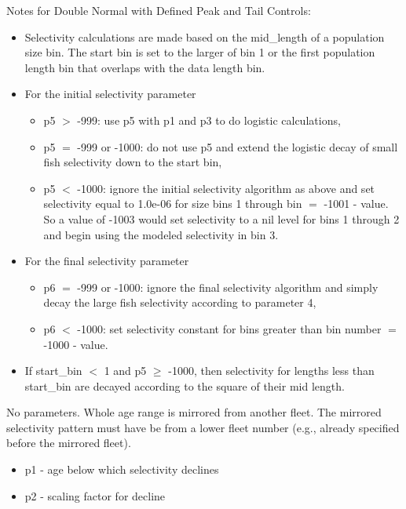 Notes for Double Normal with Defined Peak and Tail Controls:
	\begin{itemize}
		\item Selectivity calculations are made based on the mid\_length of a population size bin. The start bin is set to the larger of bin 1 or the first population length bin that overlaps with the data length bin.
		\item For the initial selectivity parameter
		\begin{itemize}
			\item p5 $>$ -999: use p5 with p1 and p3 to do logistic calculations,
			\item p5 $=$ -999 or -1000: do not use p5 and extend the logistic decay of small fish selectivity down to the start bin,
			\item p5 $<$ -1000: ignore the initial selectivity algorithm as above and set selectivity equal to 1.0e-06 for size bins 1 through bin $=$ -1001 - value. So a value of -1003 would set selectivity to a nil level for bins 1 through 2 and begin using the modeled selectivity in bin 3.
		\end{itemize}
		\item For the final selectivity parameter
		\begin{itemize}
			\item p6 $=$ -999 or -1000: ignore the final selectivity algorithm and simply decay the large fish selectivity according to parameter 4,
			\item p6 $<$ -1000: set selectivity constant for bins greater than bin number $=$ -1000 - value.
		\end{itemize}
		\item If start\_bin $<$ 1 and p5 $\geq$ -1000, then selectivity for lengths less than start\_bin are decayed according to the square of their mid length.
	\end{itemize}

No parameters. Whole age range is mirrored from another fleet. The mirrored selectivity pattern must have be from a lower fleet number (e.g., already specified before the mirrored fleet).

	\begin{itemize}
		\item p1 - age below which selectivity declines
		\item p2 - scaling factor for decline
	\end{itemize}


